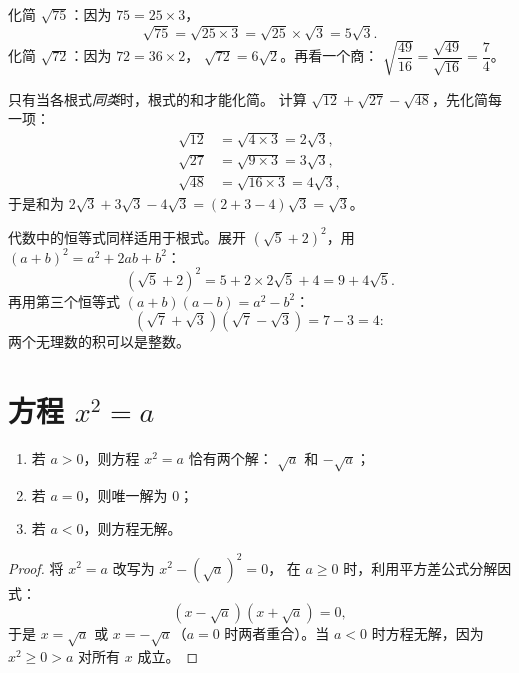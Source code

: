 \begin{example}\label{ex:g9:sqrt:simplify}
化简 $\sqrt{75}$：因为 $75 = 25 \times 3$，
\[
\sqrt{75} = \sqrt{25 \times 3} = \sqrt{25} \times \sqrt 3 = 5\sqrt3 .
\]
化简 $\sqrt{72}$：因为 $72 = 36 \times 2$，
$\sqrt{72} = 6\sqrt2$。再看一个商：
$\sqrt{\dfrac{49}{16}} = \dfrac{\sqrt{49}}{\sqrt{16}} = \dfrac74$。
\end{example}

\begin{example}[根式的加法]\label{ex:g9:sqrt:add}
只有当各根式\emph{同类}时，根式的和才能化简。
计算 $\sqrt{12} + \sqrt{27} - \sqrt{48}$，先化简每一项：
\begin{align*}
\sqrt{12} &= \sqrt{4 \times 3} = 2\sqrt3, \\
\sqrt{27} &= \sqrt{9 \times 3} = 3\sqrt3, \\
\sqrt{48} &= \sqrt{16 \times 3} = 4\sqrt3,
\end{align*}
于是和为 $2\sqrt3 + 3\sqrt3 - 4\sqrt3 = (2 + 3 - 4)\sqrt3 = \sqrt3$。
\end{example}

\begin{example}[根式的展开]\label{ex:g9:sqrt:expand}
代数中的恒等式同样适用于根式。展开
$\left(\sqrt5 + 2\right)^2$，用 $(a+b)^2 = a^2 + 2ab + b^2$：
\[
\left(\sqrt5 + 2\right)^2 = 5 + 2 \times 2\sqrt5 + 4 = 9 + 4\sqrt5 .
\]
再用第三个恒等式 $(a+b)(a-b) = a^2 - b^2$：
\[
\left(\sqrt7 + \sqrt3\right)\left(\sqrt7 - \sqrt3\right) = 7 - 3 = 4 :
\]
两个无理数的积可以是整数。
\end{example}

\section{方程 \texorpdfstring{$x^2 = a$}{x2 = a}}

\begin{theorem}[解方程 $x^2 = a$]\label{thm:g9:sqrt:equation}
\begin{enumerate}
  \item 若 $a > 0$，则方程 $x^2 = a$ 恰有两个解：
        $\sqrt a$ 和 $-\sqrt a$；
  \item 若 $a = 0$，则唯一解为 $0$；
  \item 若 $a < 0$，则方程无解。
\end{enumerate}
\end{theorem}

\begin{proof}
将 $x^2 = a$ 改写为 $x^2 - \left(\sqrt a\right)^2 = 0$，
在 $a \geq 0$ 时，利用平方差公式分解因式：
\[
\left(x - \sqrt a\right)\left(x + \sqrt a\right) = 0 ,
\]
于是 $x = \sqrt a$ 或 $x = -\sqrt a$（$a = 0$ 时两者重合）。当
$a < 0$ 时方程无解，因为 $x^2 \geq 0 > a$ 对所有 $x$ 成立。
\end{proof}

